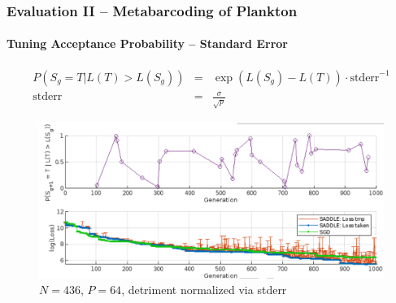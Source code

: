 \documentclass[xcolor=dvipsnames,envcountsect]{beamer}
\begin{document}
\begin{frame}
	\frametitle{Evaluation II -- Metabarcoding of Plankton}\framesubtitle{Tuning Acceptance Probability -- Standard Error}
\begin{eqnarray}
P(S_g = T | L(T) > L(S_g)) &=& \exp{(L(S_g) - L(T)) \cdot \text{stderr}^{-1}} \\
\text{stderr}&=&\frac{\sigma}{\sqrt{p}}
\end{eqnarray}	
\begin{figure}
    \includegraphics[width=.7\textwidth]{plankton_p64_gt100_gT150_eps001_Pc}
    \caption{$N = 436$, $P = 64$, detriment normalized via stderr}
\end{figure}
\end{frame}

\end{document}

